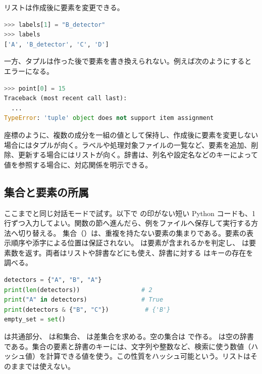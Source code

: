リストは作成後に要素を変更できる。
\begin{lstlisting}[language=Python, numbers=none, xleftmargin=2\zw]
>>> labels[1] = "B_detector"
>>> labels
['A', 'B_detector', 'C', 'D']
\end{lstlisting}

一方、タプルは作った後で要素を書き換えられない。例えば次のようにするとエラーになる。

\begin{lstlisting}[language=Python, numbers=none, xleftmargin=2\zw]
>>> point[0] = 15
Traceback (most recent call last):
  ...
TypeError: 'tuple' object does not support item assignment
\end{lstlisting}

座標のように、複数の成分を一組の値として保持し、作成後に要素を変更しない場合にはタプルが向く。ラベルや処理対象ファイルの一覧など、要素を追加、削除、更新する場合にはリストが向く。辞書は、列名や設定名などのキーによって値を参照する場合に、対応関係を明示できる。

\subsection{集合と要素の所属}

ここまでと同じ対話モードで試す。以下で \code{>>>} の印がない短い Python コードも、1 行ずつ入力してよい。関数の節へ進んだら、例をファイルへ保存して実行する方法へ切り替える。
集合（）は、重複を持たない要素の集まりである。要素の表示順序や添字による位置は保証されない。 は要素が含まれるかを判定し、 は要素数を返す。両者はリストや辞書などにも使え、辞書に対する  はキーの存在を調べる。
\begin{lstlisting}[language=Python]
detectors = {"A", "B", "A"}
print(len(detectors))                 # 2
print("A" in detectors)               # True
print(detectors & {"B", "C"})          # {'B'}
empty_set = set()
\end{lstlisting}
\code{\&} は共通部分、\code{|} は和集合、\code{-} は差集合を求める。空の集合は  で作る。\code{\{\}} は空の辞書である。集合の要素と辞書のキーには、文字列や整数など、検索に使う数値（ハッシュ値）を計算できる値を使う。この性質をハッシュ可能という。リストはそのままでは使えない。

